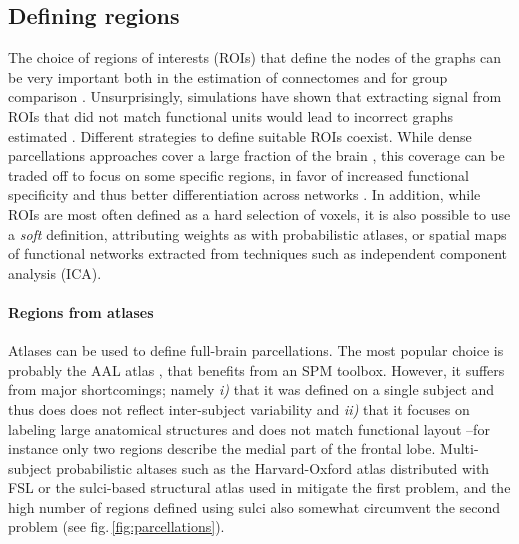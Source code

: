 \documentclass[5p]{elsarticle}
\begin{document}
\subsection{Defining regions}

The choice of regions of interests (ROIs) that define the nodes of the
graphs can be very important both in the estimation of connectomes and
for group comparison \cite{wang2009}. Unsurprisingly, simulations have
shown that extracting signal from ROIs that did not match functional
units would lead to incorrect graphs estimated \cite{smith2011}.
%
Different strategies to define suitable ROIs coexist. While dense parcellations approaches cover
a large fraction of the brain \cite{achard2006, varoquaux2010c,
wang2009}, this coverage can be traded off to focus on some specific
regions, in favor of increased functional specificity and thus better
differentiation across networks \cite{greicius2003, fair2009,
varoquaux2010b}. In addition, while
ROIs are most often defined as a hard selection of voxels, it is also
possible to use a \emph{soft} definition, attributing weights as with
probabilistic atlases, or spatial maps of functional networks extracted
from techniques such as independent component analysis (ICA).


\paragraph{Regions from atlases}
%
Atlases can be used to define full-brain parcellations. The most popular
choice is probably the AAL atlas \cite{tzourio-mazoyer2002a}, that
benefits from an SPM toolbox. However, it suffers from major
shortcomings; namely \emph{i)} that it was defined on a single subject
and thus does does not reflect inter-subject variability and \emph{ii)}
that it focuses on labeling large anatomical structures and does not match
functional layout --for instance only two regions describe the medial
part of the frontal lobe. Multi-subject probabilistic altases such as the
Harvard-Oxford atlas distributed with FSL \cite{smith2004} or the
sulci-based structural atlas used in \cite{varoquaux2010c} mitigate the
first problem, and the high number of regions defined using sulci also
somewhat circumvent the second problem (see
fig.\,\ref{fig:parcellations}).
\end{document}
